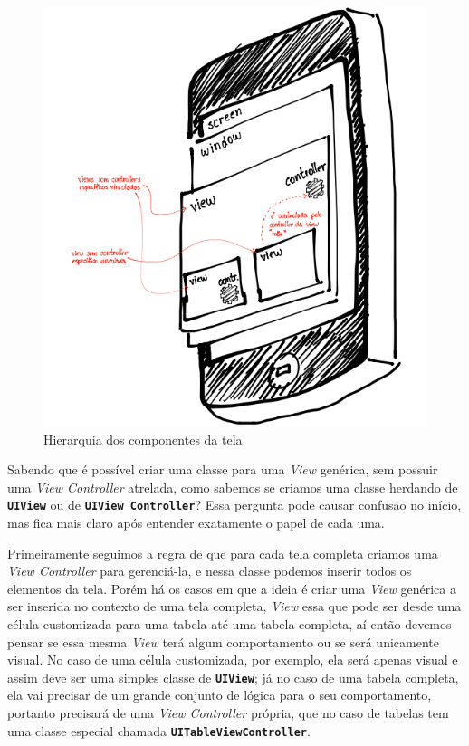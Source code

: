 \documentclass[a4paper,12pt,brazil,doubleside]{book}
\begin{document}
\begin{singlespace}
\begin{figure}[H]
  \centering
  \includegraphics[width=.75\textwidth]{figuras/screen_hierarchy.png}
  \caption{Hierarquia dos componentes da tela}
  \label{fig:a}
\end{figure}


Sabendo que é possível criar uma classe para uma \emph{View} genérica, sem possuir uma \emph{View Controller} atrelada, como sabemos se criamos uma classe herdando de \texttt{\textbf{UIView}} ou de \texttt{\textbf{UIView Controller}}? Essa pergunta pode causar confusão no início, mas fica mais claro após entender exatamente o papel de cada uma.

Primeiramente seguimos a regra de que para cada tela completa criamos uma \emph{View Controller} para gerenciá-la, e nessa classe podemos inserir todos os elementos da tela. Porém há os casos em que a ideia é criar uma \emph{View} genérica a ser inserida no contexto de uma tela completa, \emph{View} essa que pode ser desde uma célula customizada para uma tabela até uma tabela completa, aí então devemos pensar se essa mesma \emph{View} terá algum comportamento ou se será unicamente visual. No caso de uma célula customizada, por exemplo, ela será apenas visual e assim deve ser uma simples classe de \texttt{\textbf{UIView}}; já no caso de uma tabela completa, ela vai precisar de um grande conjunto de lógica para o seu comportamento, portanto precisará de uma \emph{View Controller} própria, que no caso de tabelas tem uma classe especial chamada \texttt{\textbf{UITableViewController}}.


\end{singlespace}
\end{document}
